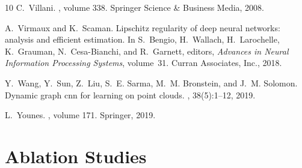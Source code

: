 \documentclass[11pt]{article}
\begin{document}
\begin{thebibliography}{10}
C.~Villani.
, volume 338.
\newblock Springer Science \& Business Media, 2008.

A.~Virmaux and K.~Scaman.
\newblock Lipschitz regularity of deep neural networks: analysis and efficient estimation.
\newblock In S.~Bengio, H.~Wallach, H.~Larochelle, K.~Grauman, N.~Cesa-Bianchi, and R.~Garnett, editors, {\em Advances in Neural Information Processing Systems}, volume~31. Curran Associates, Inc., 2018.

Y.~Wang, Y.~Sun, Z.~Liu, S.~E. Sarma, M.~M. Bronstein, and J.~M. Solomon.
\newblock Dynamic graph cnn for learning on point clouds.
, 38(5):1--12, 2019.

L.~Younes.
, volume 171.
\newblock Springer, 2019.

\end{thebibliography}
\medskip






\appendix
\newpage
\section{Ablation Studies}
\end{document}
